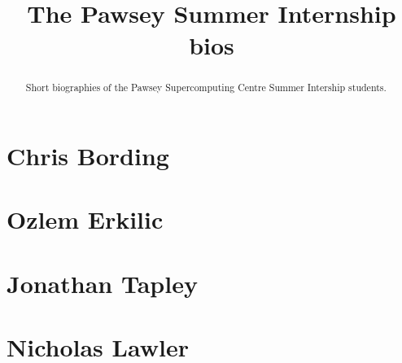 \documentclass[11pt,a4paper]{report}
\title{The Pawsey Summer Internship bios}
\begin{document}
\maketitle
\tableofcontents


\begin{abstract}

Short biographies of the Pawsey Supercomputing Centre Summer Intership students.

\end{abstract}

\chapter{Chris Bording}


\chapter{Ozlem Erkilic}



\chapter{Jonathan Tapley}





\chapter{Nicholas Lawler}

\end{document}
